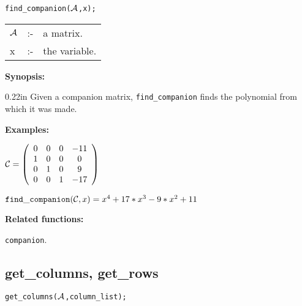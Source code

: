 \hspace*{0.175in} {\tt find\_companion(${\cal A}$,x);}

\hspace*{0.1in} 
\begin{tabular}{l l l}
${\cal A}$ &:-& a matrix. \\
x          &:-& the variable.
\end{tabular}

{\bf Synopsis:} 

\begin{addtolength}{\leftskip}{0.22in}
  Given a companion matrix, {\tt find\_companion} finds the polynomial 
from which it was made.

\end{addtolength}


{\bf Examples:}

\begin{flushleft}
\hspace*{0.175in}
\begin{math}  
{\cal C} = \left( \begin{array}{cccc} 0 & 0 & 0 & -11 \\ 1 & 0 & 0 & 0 
\\ 0 & 1 & 0 & 9 \\ 0 & 0 & 1 & -17 
\end{array} \right)
\end{math}  
\end{flushleft}

\vspace*{3mm}

\begin{flushleft}
\hspace*{0.175in}
\begin{math}  
{\tt find\_companion}({\cal C},x) = x^4+17*x^3-9*x^2+11
\end{math}  
\end{flushleft}

\vspace*{3mm}

{\bf Related functions:}

\hspace*{0.175in} {\tt companion}.

\subsection{get\_columns, get\_rows}


\hspace*{0.175in} {\tt get\_columns(${\cal A}$,column\_list);}

